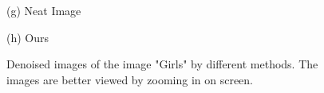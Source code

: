 \documentclass[runningheads]{llncs}
\begin{document}
\begin{figure}
{\begin{minipage}[t]{0.25\textwidth}
{\footnotesize (g) Neat Image}
\end{minipage}
\begin{minipage}[t]{0.25\textwidth}
\centering
{}
{\footnotesize (h) Ours }
\end{minipage}
}
\caption{Denoised images of the image "Girls" by different methods. The images are better viewed by zooming in on screen.}
\label{fig10}
\end{figure}
\end{document}
